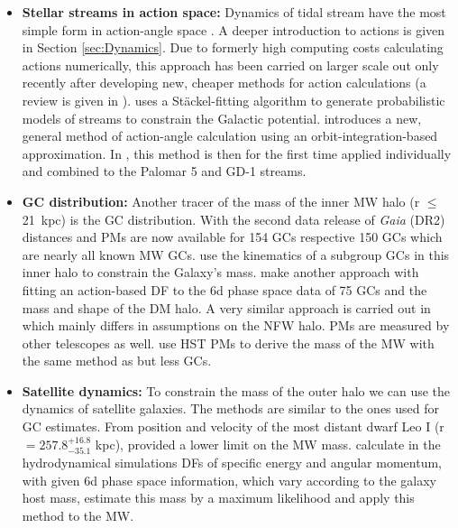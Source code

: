 \begin{itemize}
    \item \textbf{Stellar streams in action space:} Dynamics of tidal stream have the most simple form in action-angle space \citep{Tremaine...streamsactiontheory...1999, Helmi...streamsactionstheory...1999}. A deeper introduction to actions is given in Section \ref{sec:Dynamics}. Due to formerly high computing costs calculating actions numerically, this approach has been carried on larger scale out only recently after developing new, cheaper methods for action calculations (a review is given in \citet{Sanders...actionreview...2016}). \citet{Streams...Sanders...2014} uses a St\"ackel-fitting algorithm \citep{Sanders...Staeckel...2012} to generate probabilistic models of streams to constrain the Galactic potential. \citet{Streams...Bovy...2014} introduces a new, general method of action-angle calculation using an orbit-integration-based approximation. In \citet{Streams..GD1..Pal5...Bovy...2016}, this method is then for the first time applied individually and combined to the Palomar 5 and GD-1 streams.
    \item \textbf{\ac{GC} distribution:} Another tracer of the mass of the inner \ac{MW} halo (r $\le$ \SI{21}{kpc}) is the \ac{GC} distribution. With the second data release of \textit{Gaia} (DR2) distances and \acp{PM} are now available for 154 \acp{GC} \citep{Baumgardt...GCoverview...2019} respective 150 \acp{GC} \citep{Vasiliev...GCoverview...2018} which are nearly all known \ac{MW} \acp{GC}. 
    \citet{MWmass...GCmotions...Watkins...2018} use the kinematics of a subgroup \acp{GC} in this inner halo to constrain the Galaxy's mass. \citet{Posti...MWmassGCs...2018} make another approach with fitting an action-based \ac{DF} to the 6d phase space data of 75 \acp{GC} and the mass and shape of the \ac{DM} halo. A very similar approach is carried out in \citet{Vasiliev...GCoverview...2018} which mainly differs in assumptions on the \ac{NFW} halo. \acp{PM} are measured by other telescopes as well. \citet{Sohn...GCsHST..2018} use \ac{HST} \acp{PM} to derive the mass of the \ac{MW} with the same method as \citet{MWmass...GCmotions...Watkins...2018} but less \acp{GC}. 

    \item \textbf{Satellite dynamics:} To constrain the mass of the outer halo we can use the dynamics of satellite galaxies. The methods are similar to the ones used for \ac{GC} estimates. From position and velocity of the most distant dwarf Leo I (r $= 257.8_{{-35.1}}^{+16.8} $ kpc), \citet{GaiaDR...GCs...2018} provided a lower limit on the \ac{MW} mass. \citet{MWmass...sat...dyn} calculate in the hydrodynamical simulations \acp{DF} of specific energy and angular momentum, with given 6d phase space information, which vary according to the galaxy host mass, estimate this mass by a maximum likelihood and apply this method to the \ac{MW}.
\end{itemize}

